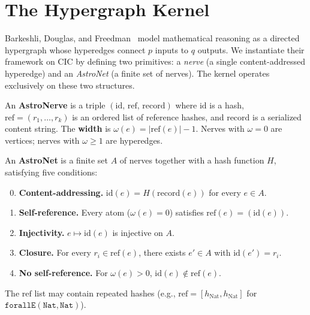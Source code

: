 \section{The Hypergraph Kernel}\label{sec:kernel}

Barkeshli, Douglas, and Freedman~\cite{BDF2026} model mathematical reasoning as a directed hypergraph whose hyperedges connect $p$ inputs to $q$ outputs.  We instantiate their framework on CIC by defining two primitives: a \emph{nerve} (a single content-addressed hyperedge) and an \emph{AstroNet} (a finite set of nerves).  The kernel operates exclusively on these two structures.

\begin{definition}[AstroNerve]
An \textbf{AstroNerve} is a triple $(\mathrm{id},\, \mathrm{ref},\, \mathrm{record})$ where $\mathrm{id}$ is a hash, $\mathrm{ref} = (r_1, \ldots, r_k)$ is an ordered list of reference hashes, and $\mathrm{record}$ is a serialized content string.  The \textbf{width} is $\omega(e) = |\mathrm{ref}(e)| - 1$.  Nerves with $\omega = 0$ are vertices; nerves with $\omega \geq 1$ are hyperedges.
\end{definition}

\begin{definition}[AstroNet]\label{def:ca-hypergraph}\label{def:well-formed}
An \textbf{AstroNet} is a finite set $A$ of nerves together with a hash function $H$, satisfying five conditions:
\begin{enumerate}
  \setcounter{enumi}{-1}
  \item \textbf{Content-addressing.} $\mathrm{id}(e) = H(\mathrm{record}(e))$ for every $e \in A$.
  \item \textbf{Self-reference.} Every atom ($\omega(e) = 0$) satisfies $\mathrm{ref}(e) = (\mathrm{id}(e))$.
  \item \textbf{Injectivity.} $e \mapsto \mathrm{id}(e)$ is injective on $A$.
  \item \textbf{Closure.} For every $r_i \in \mathrm{ref}(e)$, there exists $e' \in A$ with $\mathrm{id}(e') = r_i$.
  \item \textbf{No self-reference.} For $\omega(e) > 0$, $\mathrm{id}(e) \notin \mathrm{ref}(e)$.
\end{enumerate}
The $\mathrm{ref}$ list may contain repeated hashes (e.g., $\mathrm{ref} = [h_{\mathrm{Nat}}, h_{\mathrm{Nat}}]$ for $\texttt{forallE}(\texttt{Nat}, \texttt{Nat})$).
\end{definition}

